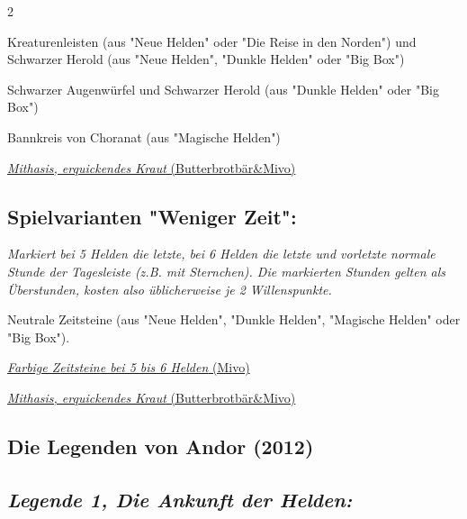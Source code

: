 \documentclass[10pt, a4paper, oneside]{book}
\newcommand{\fan}[1]{\textit{#1}}
\begin{document}
\begin{multicols*}{2}
\begin{nobgcolor}
\bullet{} Kreaturenleisten (aus "Neue Helden"\supercite{nh-begleitheft} oder "Die Reise in den Norden"\supercite{dridn-begleitheft}) und Schwarzer Herold (aus "Neue Helden"\supercite{nh-begleitheft}, "Dunkle Helden"\supercite{dh-begleitheft} oder "Big Box"\supercite{bibo-bonus-heft})

\bullet{} Schwarzer Augenwürfel und Schwarzer Herold (aus "Dunkle Helden"\supercite{dh-begleitheft} oder "Big Box"\supercite{bibo-bonus-heft})

\bullet{} Bannkreis von Choranat (aus "Magische Helden")
\supercite{mh-begleitheft}

\href{https://legenden-von-andor.de/forum/viewtopic.php?p=132952#p132952}
{\blacktriangleright \fan{Mithasis, erquickendes Kraut} (Butterbrotbär\&Mivo)}




\subsection{Spielvarianten "Weniger Zeit":}

\bullet{} \fan{Markiert bei 5 Helden die letzte, bei 6 Helden die letzte und vorletzte normale Stunde der Tagesleiste (z.B. mit Sternchen). Die markierten Stunden gelten als Überstunden, kosten also üblicherweise je 2 Willenspunkte.}

\bullet{} Neutrale Zeitsteine (aus "Neue Helden"\supercite{nh-begleitheft}, "Dunkle Helden"\supercite{dh-begleitheft}, "Magische Helden"\supercite{mh-begleitheft} oder "Big Box"\supercite{bibo-bonus-heft}).

\href{https://legenden-von-andor.de/forum/viewtopic.php?p=130491#p130491}
{\blacktriangleright \fan{Farbige Zeitsteine bei 5 bis 6 Helden} (Mivo)}

\href{https://legenden-von-andor.de/forum/viewtopic.php?p=132952#p132952}
{\blacktriangleright \fan{Mithasis, erquickendes Kraut} (Butterbrotbär\&Mivo)}


\end{nobgcolor}







\begin{bgcolor}
\section{Die Legenden von Andor (2012)}


\subsection{\fan{Legende 1, Die Ankunft der Helden:}}



\end{bgcolor}
\end{multicols*}
\end{document}
